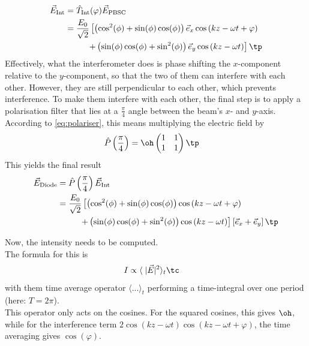 \begin{align}
  \vec{E}_\text{Int} &= \hat{T}_\text{Int}(\varphi) \vec{E}_\text{PBSC} \\
                     &= \frac{E_0}{\sqrt{2}} \left[ \left(\cos^2(\phi) + \sin(\phi)\cos(\phi)\right) \vec{e}_x \cos\left(kz - \omega t + \varphi\right)\right. \\
                     & \left.\hspace{9.2mm}+\left(\sin(\phi)\cos(\phi) + \sin^2(\phi) \right) \vec{e}_y \cos\left(kz - \omega t\right)\right] \tp
\end{align}
Effectively, what the interferometer does is phase shifting the $x$-component relative to the $y$-component, so that the two of them can interfere with each other. However, they are still perpendicular to each other, which prevents interference. To make them interfere with each other, the final step is to apply a polarisation filter that lies at a $\frac{\pi}{4}$ angle between the beam's $x$- and $y$-axis. According to \autoref{eq:polariser}, this means multiplying the electric field by 
\begin{align}
  \hat P \left(\frac{\pi}{4}\right) &=\oh
  \begin{pmatrix}
    1 & 1 \\
    1 & 1 
  \end{pmatrix}\tp
\end{align}
This yields the final result 
\begin{align}
  \vec{E}_\text{Diode} &= \hat P\left(\frac{\pi}{4}\right) \vec{E}_\text{Int}\\
                     &= \frac{E_0}{\sqrt{2}} \left[ \left(\cos^2(\phi) + \sin(\phi)\cos(\phi)\right) \cos\left(kz - \omega t + \varphi\right)\right. \\
                     & \left.\hspace{9.2mm}+\left(\sin(\phi)\cos(\phi) + \sin^2(\phi) \right) \cos\left(kz - \omega t\right)\right]\left[\vec{e}_x + \vec{e}_y \right] \tp
\end{align}



Now, the intensity needs to be computed.\\
The formula for this is
\begin{align}
  I &\propto \langle \hspace{1mm} |\vec{E}|^2\rangle_t \tc
\end{align}
with them time average operator $\langle\text{...}\rangle_t$ performing a time-integral over one period (here: $T = 2\pi$).\\
This operator only acts on the cosines. For the squared cosines, this gives $\oh$, while for the interference term $2\cos\left(kz - \omega t\right) \cos\left(kz - \omega t + \varphi\right)$, the time averaging gives $\cos(\varphi)$.





